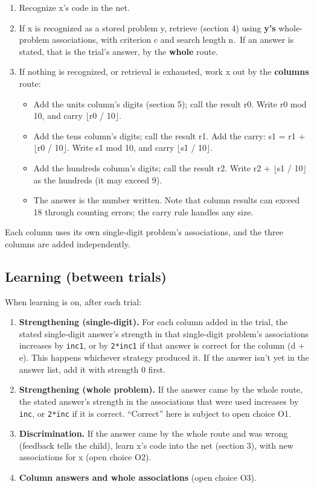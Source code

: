 \begin{enumerate}
\def\labelenumi{\arabic{enumi}.}
\tightlist
\item
  Recognize x's code in the net.
\item
  If x is recognized as a stored problem y, retrieve (section 4) using \textbf{y's} whole-problem associations, with criterion c and search length n.~If an answer is stated, that is the trial's answer, by the \textbf{whole} route.
\item
  If nothing is recognized, or retrieval is exhausted, work x out by the \textbf{columns} route:

  \begin{itemize}
  \tightlist
  \item
    Add the units column's digits (section 5); call the result r0. Write r0 mod 10, and carry $\lfloor$r0 / 10$\rfloor$.
  \item
    Add the tens column's digits; call the result r1. Add the carry: s1 = r1 + $\lfloor$r0 / 10$\rfloor$. Write s1 mod 10, and carry $\lfloor$s1 / 10$\rfloor$.
  \item
    Add the hundreds column's digits; call the result r2. Write r2 + $\lfloor$s1 / 10$\rfloor$ as the hundreds (it may exceed 9).
  \item
    The answer is the number written. Note that column results can exceed 18 through counting errors; the carry rule handles any size.
  \end{itemize}
\end{enumerate}

Each column uses its own single-digit problem's associations, and the three columns are added independently.

\subsection{Learning (between trials)}\label{learning-between-trials}

When learning is on, after each trial:

\begin{enumerate}
\def\labelenumi{\arabic{enumi}.}
\tightlist
\item
  \textbf{Strengthening (single-digit).} For each column added in the trial, the stated single-digit answer's strength in that single-digit problem's associations increases by \texttt{inc1}, or by \texttt{2*inc1} if that answer is correct for the column (d + e). This happens whichever strategy produced it. If the answer isn't yet in the answer list, add it with strength 0 first.
\item
  \textbf{Strengthening (whole problem).} If the answer came by the whole route, the stated answer's strength in the associations that were used increases by \texttt{inc}, or \texttt{2*inc} if it is correct. ``Correct'' here is subject to open choice O1.
\item
  \textbf{Discrimination.} If the answer came by the whole route and was wrong (feedback tells the child), learn x's code into the net (section 3), with new associations for x (open choice O2).
\item
  \textbf{Column answers and whole associations} (open choice O3).
\end{enumerate}

